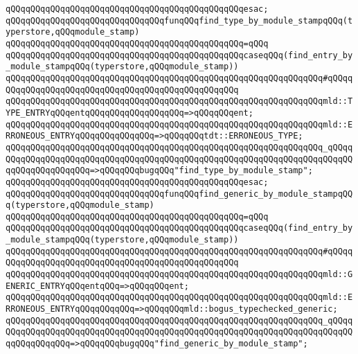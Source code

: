 \verb|qQQqqQQqqQQqqQQqqQQqqQQqqQQqqQQqqQQqqQQqqQQqqQQqesac;|\newline
\newline
\verb|qQQqqQQqqQQqqQQqqQQqqQQqqQQqqQQqfunqQQqfind_type_by_module_stampqQQq(typerstore,qQQqmodule_stamp)|\newline
\verb|qQQqqQQqqQQqqQQqqQQqqQQqqQQqqQQqqQQqqQQqqQQqqQQq=qQQq|\newline
\verb|qQQqqQQqqQQqqQQqqQQqqQQqqQQqqQQqqQQqqQQqqQQqqQQqcaseqQQq(find_entry_by_module_stampqQQq(typerstore,qQQqmodule_stamp))|\newline
\verb|qQQqqQQqqQQqqQQqqQQqqQQqqQQqqQQqqQQqqQQqqQQqqQQqqQQqqQQqqQQqqQQq#qQQqqQQqqQQqqQQqqQQqqQQqqQQqqQQqqQQqqQQqqQQqqQQqqQQq|\newline
\verb|qQQqqQQqqQQqqQQqqQQqqQQqqQQqqQQqqQQqqQQqqQQqqQQqqQQqqQQqqQQqqQQqmld::TYPE_ENTRYqQQqentqQQqqQQqqQQqqQQqqQQq=>qQQqqQQqent;|\newline
\verb|qQQqqQQqqQQqqQQqqQQqqQQqqQQqqQQqqQQqqQQqqQQqqQQqqQQqqQQqqQQqqQQqmld::ERRONEOUS_ENTRYqQQqqQQqqQQqqQQq=>qQQqqQQqtdt::ERRONEOUS_TYPE;|\newline
\verb|qQQqqQQqqQQqqQQqqQQqqQQqqQQqqQQqqQQqqQQqqQQqqQQqqQQqqQQqqQQqqQQq_qQQqqQQqqQQqqQQqqQQqqQQqqQQqqQQqqQQqqQQqqQQqqQQqqQQqqQQqqQQqqQQqqQQqqQQqqQQqqQQqqQQqqQQqqQQq=>qQQqqQQqbugqQQq"find_type_by_module_stamp";|\newline
\verb|qQQqqQQqqQQqqQQqqQQqqQQqqQQqqQQqqQQqqQQqqQQqqQQqesac;|\newline
\newline
\verb|qQQqqQQqqQQqqQQqqQQqqQQqqQQqqQQqfunqQQqfind_generic_by_module_stampqQQq(typerstore,qQQqmodule_stamp)|\newline
\verb|qQQqqQQqqQQqqQQqqQQqqQQqqQQqqQQqqQQqqQQqqQQqqQQq=qQQq|\newline
\verb|qQQqqQQqqQQqqQQqqQQqqQQqqQQqqQQqqQQqqQQqqQQqqQQqcaseqQQq(find_entry_by_module_stampqQQq(typerstore,qQQqmodule_stamp))|\newline
\verb|qQQqqQQqqQQqqQQqqQQqqQQqqQQqqQQqqQQqqQQqqQQqqQQqqQQqqQQqqQQqqQQq#qQQqqQQqqQQqqQQqqQQqqQQqqQQqqQQqqQQqqQQqqQQqqQQqqQQq|\newline
\verb|qQQqqQQqqQQqqQQqqQQqqQQqqQQqqQQqqQQqqQQqqQQqqQQqqQQqqQQqqQQqqQQqmld::GENERIC_ENTRYqQQqentqQQq=>qQQqqQQqent;|\newline
\verb|qQQqqQQqqQQqqQQqqQQqqQQqqQQqqQQqqQQqqQQqqQQqqQQqqQQqqQQqqQQqqQQqmld::ERRONEOUS_ENTRYqQQqqQQqqQQq=>qQQqqQQqmld::bogus_typechecked_generic;|\newline
\verb|qQQqqQQqqQQqqQQqqQQqqQQqqQQqqQQqqQQqqQQqqQQqqQQqqQQqqQQqqQQqqQQq_qQQqqQQqqQQqqQQqqQQqqQQqqQQqqQQqqQQqqQQqqQQqqQQqqQQqqQQqqQQqqQQqqQQqqQQqqQQqqQQqqQQqqQQq=>qQQqqQQqbugqQQq"find_generic_by_module_stamp";|\newline
